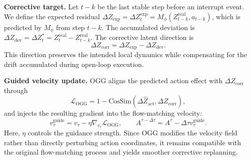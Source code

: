 \textbf{Corrective target.}
Let $t-k$ be the last stable step before an interrupt event. We define the expected residual $\Delta Z_{\mathrm{exp}} = \Delta Z_t^{\mathrm{exp}} = M_\phi(Z_{t-k}^{\mathrm{real}}, a_{t-k})$, which is predicted by $M_\phi$ from step $t-k$. The accumulated deviation is $\Delta Z_{\mathrm{dev}} = \Delta Z_t^{*} = Z_t^{\mathrm{real}} - Z_{t-k}^{\mathrm{real}}$. The corrective latent direction is
\begin{equation}
\Delta Z_{\mathrm{corr}}=\Delta Z_{\mathrm{exp}}-\Delta Z_{\mathrm{dev}}.
\label{eq:corrective_direction_compact}
\end{equation}
This direction preserves the intended local dynamics while compensating for the drift accumulated during open-loop execution.

\textbf{Guided velocity update.}
OGG aligns the predicted action effect with $\Delta Z_{\mathrm{corr}}$ through
\begin{equation}
\mathcal{L}_{\mathrm{OGG}}=1-\mathrm{CosSim}(\Delta\hat{Z}_{\mathrm{act}},\Delta Z_{\mathrm{corr}}),
\label{eq:ogg_loss_compact}
\end{equation}
and injects the resulting gradient into the flow-matching velocity:
\begin{equation}
v_\tau^{\mathrm{guide}}=v_\tau-\eta\nabla_{v_\tau}\mathcal{L}_{\mathrm{OGG}},
\qquad
A^{\tau-\Delta\tau}=A^\tau-\Delta\tau v_\tau^{\mathrm{guide}} .
\label{eq:ogg_guidance_compact}
\end{equation}
Here, $\eta$ controls the guidance strength. Since OGG modifies the velocity field rather than directly perturbing action coordinates, it remains compatible with the original flow-matching process and yields smoother corrective replanning.

